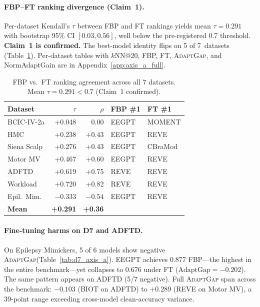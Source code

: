 \documentclass{article}
\newcommand{\adaptgap}{\textsc{AdaptGap}\xspace}
\begin{document}
\paragraph{FBP--FT ranking divergence (Claim~1).}
Per-dataset Kendall's $\tau$ between FBP and FT rankings yields mean $\tau = 0.291$ with bootstrap 95\% CI $[0.03, 0.56]$, well below the pre-registered 0.7 threshold. \textbf{Claim~1 is confirmed.} The best-model identity flips on 5 of 7~datasets (Table~\ref{tab:rank_agreement}). Per-dataset tables with $k$NN@20, FBP, FT, \adaptgap, and NormAdaptGain are in Appendix~\ref{app:axis_a_full}.

\begin{table}[t]
  \caption{FBP vs.\ FT ranking agreement across all 7 datasets. Mean $\tau = 0.291 < 0.7$ (Claim~1 confirmed).}
  \label{tab:rank_agreement}
  \centering
  \small
  \begin{tabular}{lrrll}
    \toprule
    Dataset & $\tau$ & $\rho$ & FBP \#1 & FT \#1 \\
    \midrule
    BCIC-IV-2a & +0.048 & 0.00 & EEGPT & MOMENT \\
    HMC & +0.238 & +0.43 & EEGPT & REVE \\
    Siena Scalp & +0.276 & +0.43 & EEGPT & CBraMod \\
    Motor MV & +0.467 & +0.60 & EEGPT & REVE \\
    ADFTD & +0.619 & +0.75 & REVE & REVE \\
    Workload & +0.720 & +0.82 & REVE & REVE \\
    Epil.\ Mim. & $-0.333$ & $-0.54$ & EEGPT & REVE \\
    \midrule
    \textbf{Mean} & \textbf{+0.291} & \textbf{+0.36} & & \\
    \bottomrule
  \end{tabular}
\end{table}

\paragraph{Fine-tuning harms on D7 and ADFTD.}
On Epilepsy Mimickers, 5 of 6 models show negative \adaptgap (Table~\ref{tab:d7_axis_a}). EEGPT achieves 0.877 FBP---the highest in the entire benchmark---yet collapses to 0.676 under FT ($\text{AdaptGap} = -0.202$). The same pattern appears on ADFTD (5/7 negative). Full \adaptgap span across the benchmark: $-0.103$ (BIOT on ADFTD) to $+0.289$ (REVE on Motor MV), a 39-point range exceeding cross-model clean-accuracy variance.
\end{document}
